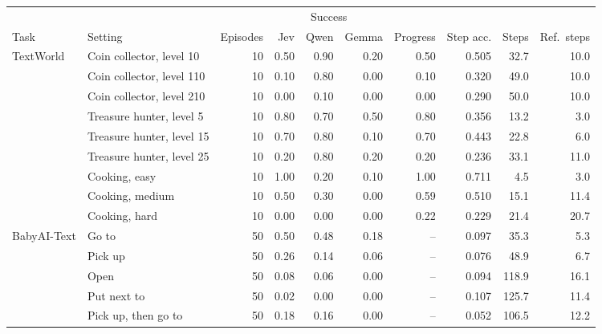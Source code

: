\begin{tabular}{l l r r r r r r r r}
    \toprule
    & & & \multicolumn{3}{c}{Success} & & & & \\
    \cmidrule(lr){4-6}
    Task & Setting & Episodes & Jev & Qwen & Gemma & Progress & Step acc. & Steps & Ref.\ steps \\
    \midrule
    TextWorld & Coin collector, level 10 & 10 & 0.50 & 0.90 & 0.20 & 0.50 & 0.505 & 32.7 & 10.0 \\
    \rowcolor{gray!10} & Coin collector, level 110 & 10 & 0.10 & 0.80 & 0.00 & 0.10 & 0.320 & 49.0 & 10.0 \\
     & Coin collector, level 210 & 10 & 0.00 & 0.10 & 0.00 & 0.00 & 0.290 & 50.0 & 10.0 \\
    \rowcolor{gray!10} & Treasure hunter, level 5 & 10 & 0.80 & 0.70 & 0.50 & 0.80 & 0.356 & 13.2 & 3.0 \\
     & Treasure hunter, level 15 & 10 & 0.70 & 0.80 & 0.10 & 0.70 & 0.443 & 22.8 & 6.0 \\
    \rowcolor{gray!10} & Treasure hunter, level 25 & 10 & 0.20 & 0.80 & 0.20 & 0.20 & 0.236 & 33.1 & 11.0 \\
     & Cooking, easy & 10 & 1.00 & 0.20 & 0.10 & 1.00 & 0.711 & 4.5 & 3.0 \\
    \rowcolor{gray!10} & Cooking, medium & 10 & 0.50 & 0.30 & 0.00 & 0.59 & 0.510 & 15.1 & 11.4 \\
     & Cooking, hard & 10 & 0.00 & 0.00 & 0.00 & 0.22 & 0.229 & 21.4 & 20.7 \\
    \midrule
    \rowcolor{gray!10}BabyAI-Text & Go to & 50 & 0.50 & 0.48 & 0.18 & -- & 0.097 & 35.3 & 5.3 \\
     & Pick up & 50 & 0.26 & 0.14 & 0.06 & -- & 0.076 & 48.9 & 6.7 \\
    \rowcolor{gray!10} & Open & 50 & 0.08 & 0.06 & 0.00 & -- & 0.094 & 118.9 & 16.1 \\
     & Put next to & 50 & 0.02 & 0.00 & 0.00 & -- & 0.107 & 125.7 & 11.4 \\
    \rowcolor{gray!10} & Pick up, then go to & 50 & 0.18 & 0.16 & 0.00 & -- & 0.052 & 106.5 & 12.2 \\
    \bottomrule
\end{tabular}